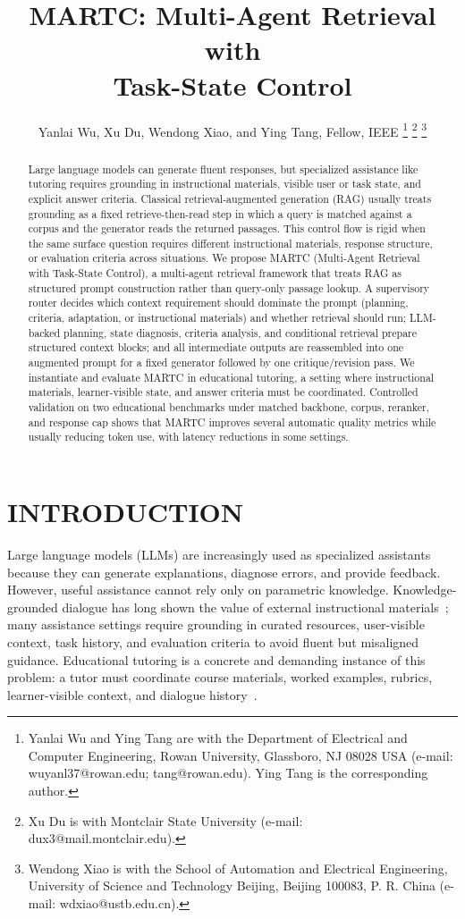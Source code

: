 \documentclass[letterpaper, 10 pt, conference]{ieeeconf}
\title{\LARGE \bf
MARTC: Multi-Agent Retrieval with \\
Task-State Control
}
\author{Yanlai Wu, Xu Du, Wendong Xiao, and Ying Tang, Fellow, IEEE%
\thanks{Yanlai Wu and Ying Tang are with the Department of Electrical and Computer Engineering, Rowan University, Glassboro, NJ 08028 USA (e-mail: wuyanl37@rowan.edu; tang@rowan.edu). Ying Tang is the corresponding author.}%
\thanks{Xu Du is with Montclair State University (e-mail: dux3@mail.montclair.edu).}%
\thanks{Wendong Xiao is with the School of Automation and Electrical Engineering, University of Science and Technology Beijing, Beijing 100083, P. R. China (e-mail: wdxiao@ustb.edu.cn).}%
}
\begin{document}
\maketitle
\thispagestyle{empty}
\pagestyle{empty}
\setlength{\parskip}{0pt}
\setlength{\textfloatsep}{6pt plus 1pt minus 2pt}
\setlength{\dbltextfloatsep}{6pt plus 1pt minus 2pt}
\setlength{\floatsep}{5pt plus 1pt minus 1pt}
\setlength{\dblfloatsep}{5pt plus 1pt minus 1pt}

\begin{abstract}
Large language models can generate fluent responses, but specialized assistance like tutoring requires grounding in instructional materials, visible user or task state, and explicit answer criteria. Classical retrieval-augmented generation (RAG) usually treats grounding as a fixed retrieve-then-read step in which a query is matched against a corpus and the generator reads the returned passages. This control flow is rigid when the same surface question requires different instructional materials, response structure, or evaluation criteria across situations. We propose \textsc{MARTC} (Multi-Agent Retrieval with Task-State Control), a multi-agent retrieval framework that treats RAG as structured prompt construction rather than query-only passage lookup. A supervisory router decides which context requirement should dominate the prompt (planning, criteria, adaptation, or instructional materials) and whether retrieval should run; LLM-backed planning, state diagnosis, criteria analysis, and conditional retrieval prepare structured context blocks; and all intermediate outputs are reassembled into one augmented prompt for a fixed generator followed by one critique/revision pass. We instantiate and evaluate \textsc{MARTC} in educational tutoring, a setting where instructional materials, learner-visible state, and answer criteria must be coordinated. Controlled validation on two educational benchmarks under matched backbone, corpus, reranker, and response cap shows that \textsc{MARTC} improves several automatic quality metrics while usually reducing token use, with latency reductions in some settings.
\end{abstract}

\section{INTRODUCTION}
Large language models (LLMs) are increasingly used as specialized assistants because they can generate explanations, diagnose errors, and provide feedback. However, useful assistance cannot rely only on parametric knowledge. Knowledge-grounded dialogue has long shown the value of external instructional materials~\cite{dinan2019wizard}; many assistance settings require grounding in curated resources, user-visible context, task history, and evaluation criteria to avoid fluent but misaligned guidance. Educational tutoring is a concrete and demanding instance of this problem: a tutor must coordinate course materials, worked examples, rubrics, learner-visible context, and dialogue history~\cite{chevalier2024sciencetutors,liu2026agenttutor}.
\end{document}
